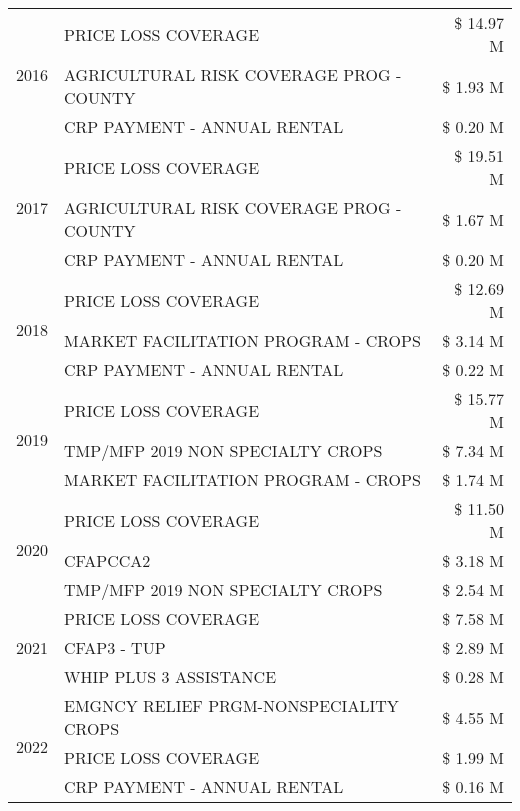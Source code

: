 \begin{tabular}{llr}
\multirow[t]{3}{*}{2016} & PRICE LOSS COVERAGE & \$ 14.97 M \\
 & AGRICULTURAL RISK COVERAGE PROG - COUNTY & \$ 1.93 M \\
 & CRP PAYMENT - ANNUAL RENTAL & \$ 0.20 M \\
\cline{1-3}
\multirow[t]{3}{*}{2017} & PRICE LOSS COVERAGE & \$ 19.51 M \\
 & AGRICULTURAL RISK COVERAGE PROG - COUNTY & \$ 1.67 M \\
 & CRP PAYMENT - ANNUAL RENTAL & \$ 0.20 M \\
\cline{1-3}
\multirow[t]{3}{*}{2018} & PRICE LOSS COVERAGE & \$ 12.69 M \\
 & MARKET FACILITATION PROGRAM - CROPS & \$ 3.14 M \\
 & CRP PAYMENT - ANNUAL RENTAL & \$ 0.22 M \\
\cline{1-3}
\multirow[t]{3}{*}{2019} & PRICE LOSS COVERAGE & \$ 15.77 M \\
 & TMP/MFP 2019 NON SPECIALTY CROPS & \$ 7.34 M \\
 & MARKET FACILITATION PROGRAM - CROPS & \$ 1.74 M \\
\cline{1-3}
\multirow[t]{3}{*}{2020} & PRICE LOSS COVERAGE & \$ 11.50 M \\
 & CFAPCCA2 & \$ 3.18 M \\
 & TMP/MFP 2019 NON SPECIALTY CROPS & \$ 2.54 M \\
\cline{1-3}
\multirow[t]{3}{*}{2021} & PRICE LOSS COVERAGE & \$ 7.58 M \\
 & CFAP3 - TUP & \$ 2.89 M \\
 & WHIP PLUS 3 ASSISTANCE & \$ 0.28 M \\
\cline{1-3}
\multirow[t]{3}{*}{2022} & EMGNCY RELIEF PRGM-NONSPECIALITY CROPS & \$ 4.55 M \\
 & PRICE LOSS COVERAGE & \$ 1.99 M \\
 & CRP PAYMENT - ANNUAL RENTAL & \$ 0.16 M \\
\cline{1-3}
\bottomrule
\end{tabular}
